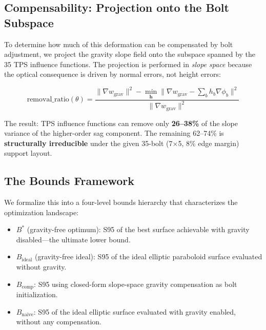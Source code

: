 \documentclass{CVM}
\begin{document}
\subsection{Compensability: Projection onto the Bolt Subspace}

To determine how much of this deformation can be compensated by bolt
adjustment, we project the gravity slope field onto the subspace spanned by the
35 TPS influence functions. The projection is performed in \emph{slope space}
because the optical consequence is driven by normal errors, not height errors:

\begin{equation}
\text{removal\_ratio}(\theta) =
\frac{\|\nabla w_{\text{grav}}\|^2 - \min_{\mathbf{h}}\|\nabla w_{\text{grav}} - \sum_b h_b \nabla\phi_b\|^2}
{\|\nabla w_{\text{grav}}\|^2}
\label{eq:removal}
\end{equation}

The result: TPS influence functions can remove only \textbf{26--38\%} of the
slope variance of the higher-order sag component. The remaining 62--74\% is
\textbf{structurally irreducible} under the given 35-bolt (7$\times$5, 8\%
edge margin) support layout.

\subsection{The Bounds Framework}

We formalize this into a four-level bounds hierarchy that characterizes the
optimization landscape:

\begin{itemize}
  \item \textbf{$B^*$} (gravity-free optimum): S95 of the best surface
  achievable with gravity disabled---the ultimate lower bound.
  \item \textbf{$B_{\text{ideal}}$} (gravity-free ideal): S95 of the ideal
  elliptic paraboloid surface evaluated without gravity.
  \item \textbf{$B_{\text{comp}}$}: S95 using closed-form slope-space gravity
  compensation as bolt initialization.
  \item \textbf{$B_{\text{naive}}$}: S95 of the ideal elliptic surface
  evaluated with gravity enabled, without any compensation.
\end{itemize}
\end{document}
